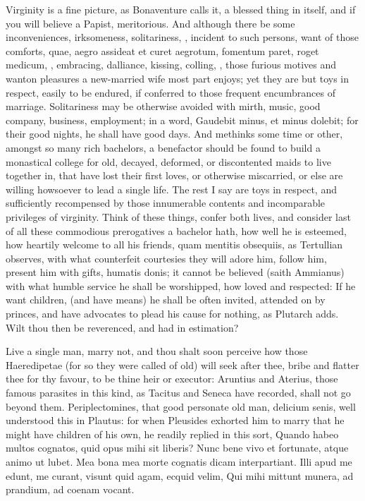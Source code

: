 {Virginity is a fine picture, as Bonaventure calls it, a blessed
thing in itself, and if you will believe a Papist, meritorious. And
although there be some inconveniences, irksomeness, solitariness, \etc{},
incident to such persons, want of those comforts, quae, aegro assideat
et curet aegrotum, fomentum paret, roget medicum, \etc{}, embracing,
dalliance, kissing, colling, \etc{}, those furious motives and wanton
pleasures a new-married wife most part enjoys; yet they are but toys in
respect, easily to be endured, if conferred to those frequent
encumbrances of marriage. Solitariness may be otherwise avoided with
mirth, music, good company, business, employment; in a word,
Gaudebit minus, et minus dolebit; for their good nights, he shall
have good days. And methinks some time or other, amongst so many rich
bachelors, a benefactor should be found to build a monastical college
for old, decayed, deformed, or discontented maids to live together in,
that have lost their first loves, or otherwise miscarried, or else are
willing howsoever to lead a single life. The rest I say are toys in
respect, and sufficiently recompensed by those innumerable contents and
incomparable privileges of virginity. Think of these things, confer
both lives, and consider last of all these commodious prerogatives a
bachelor hath, how well he is esteemed, how heartily welcome to all his
friends, quam mentitis obsequiis, as Tertullian observes, with what
counterfeit courtesies they will adore him, follow him, present him
with gifts, humatis donis; it cannot be believed (saith Ammianus)
with what humble service he shall be worshipped, how loved and
respected: If he want children, (and have means) he shall be often
invited, attended on by princes, and have advocates to plead his cause
for nothing, as  Plutarch adds. Wilt thou then be reverenced, and
had in estimation?

Live a single man, marry not, and thou shalt soon perceive how those
Haeredipetae (for so they were called of old) will seek after thee,
bribe and flatter thee for thy favour, to be thine heir or executor:
Aruntius and Aterius, those famous parasites in this kind, as Tacitus
and Seneca have recorded, shall not go beyond them.
Periplectomines, that good personate old man, delicium senis, well
understood this in Plautus: for when Pleusides exhorted him to marry
that he might have children of his own, he readily replied in this
sort,
Quando habeo multos cognatos, quid opus mihi sit liberis?
Nunc bene vivo et fortunate, atque animo ut lubet.
Mea bona mea morte cognatis dicam interpartiant.
Illi apud me edunt, me curant, visunt quid agam, ecquid velim,
Qui mihi mittunt munera, ad prandium, ad coenam vocant.

}
